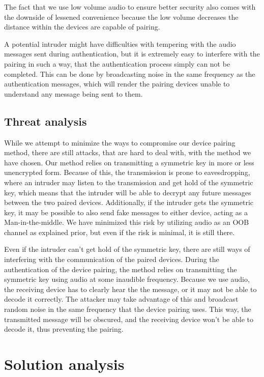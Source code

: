 \documentclass[12pt]{article}
\begin{document}
The fact that we use low volume audio to ensure better security also comes with the downside of lessened convenience because the low volume decreases the distance within the devices are capable of pairing.

A potential intruder might have difficulties with tempering with the audio messages sent during authentication, but it is extremely easy to interfere with the pairing in such a way, that the authentication process simply can not be completed. This can be done by broadcasting noise in the same frequency as the authentication messages, which will render the pairing devices unable to understand any message being sent to them.


\subsection{Threat analysis}
\label{sub:Threat analysis}

While we attempt to minimize the ways to compromise our device pairing method, there are still attacks, that are hard to deal with, with the method we have chosen. Our method relies on transmitting a symmetric key in more or less unencrypted form. Because of this, the transmission is prone to eavesdropping, where an intruder may listen to the transmission and get hold of the symmetric key, which means that the intruder will be able to decrypt any future messages between the two paired devices. Additionally, if the intruder gets the symmetric key, it may be possible to also send fake messages to either device, acting as a Man-in-the-middle. We have minimized this risk by utilizing audio as an OOB channel as explained prior, but even if the risk is minimal, it is still there.

Even if the intruder can't get hold of the symmetric key, there are still ways of interfering with the communication of the paired devices. During the authentication of the device pairing, the method relies on transmitting the symmetric key using audio at some inaudible frequency. Because we use audio, the receiving device has to clearly hear the the message, or it may not be able to decode it correctly. The attacker may take advantage of this and broadcast random noise in the same frequency that the device pairing uses. This way, the transmitted message will be obscured, and the receiving device won't be able to decode it, thus preventing the pairing.

\section{Solution analysis}
\end{document}
